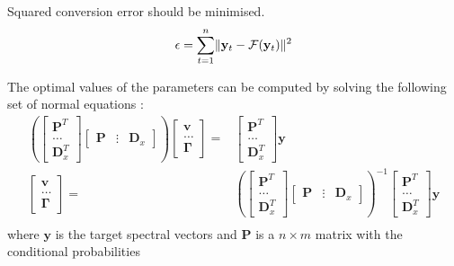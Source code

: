 Squared conversion error should be minimised.
\begin{equation}
	\epsilon=\sum_{t=1}^{n}\lVert\mathbf{y}_t - \mathcal{F}(\mathbf{y}_t)\rVert^2
\end{equation}

The optimal values of the parameters can be computed by solving the following set of normal equations \cite{stylianou95}:
\begin{equation}
	\label{eq:param_computed}
	\begin{split}
		\left( 
		\begin{bmatrix}
			\mathbf{P}^T \\
			\dots \\
			\mathbf{D}_x^T
		\end{bmatrix}
		\begin{bmatrix}
			\mathbf{P} & \vdots & \mathbf{D}_x
		\end{bmatrix}
		 \right)
		\begin{bmatrix}
			\mathbf{v} \\
			\dots \\
			\mathbf{\Gamma}
		\end{bmatrix}
		= &
		\begin{bmatrix}
			\mathbf{P}^T \\
			\dots \\
			\mathbf{D}_x^T
		\end{bmatrix}
		\mathbf{y} \\ %
		\begin{bmatrix}
			\mathbf{v} \\
			\dots \\
			\mathbf{\Gamma}
		\end{bmatrix}
		= &
		\left( 
		\begin{bmatrix}
			\mathbf{P}^T \\
			\dots \\
			\mathbf{D}_x^T
		\end{bmatrix}
		\begin{bmatrix}
			\mathbf{P} & \vdots & \mathbf{D}_x
		\end{bmatrix}
		 \right)^{-1}
		\begin{bmatrix}
			\mathbf{P}^T \\
			\dots \\
			\mathbf{D}_x^T
		\end{bmatrix}
		\mathbf{y} \\ %
	\end{split}
\end{equation}
where $\mathbf{y}$ is the target spectral vectors and $\mathbf{P}$ is a $n \times m$ matrix with the conditional probabilities

